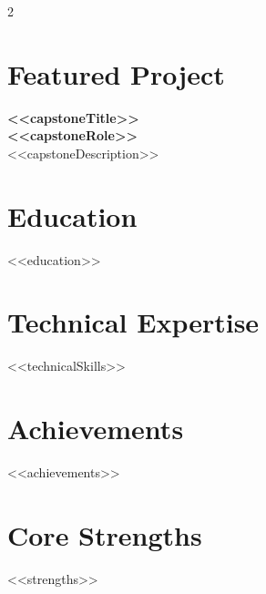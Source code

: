 \documentclass[10pt,a4paper]{article}
\begin{document}
\begin{multicols}{2}
    \columnsep=20pt
    
    \section*{Featured Project}
    {\fontsize{11pt}{13pt}\selectfont\bfseries\color{dark} <<capstoneTitle>>} \\[2pt]
    {\fontsize{8.5pt}{10pt}\selectfont\color{accent}\bfseries <<capstoneRole>>} \\[4pt]
    {\fontsize{8.5pt}{11pt}\selectfont\color{textmain} <<capstoneDescription>>}

    \section*{Education}
    {\fontsize{9pt}{11pt}\selectfont <<education>>}

    \newpage

    \section*{Technical Expertise}
    \begin{tcolorbox}[card]
        {\fontsize{8.5pt}{11pt}\selectfont <<technicalSkills>>}
    \end{tcolorbox}

    \section*{Achievements}
    \begin{itemize}[leftmargin=*, label=\textcolor{primary}{\faTrophy}, itemsep=2pt, topsep=0pt, parsep=0pt]
        {\fontsize{8.5pt}{10pt}\selectfont <<achievements>>}
    \end{itemize}

    \section*{Core Strengths}
    \begin{itemize}[leftmargin=*, label=\textcolor{accent}{\faCheckCircle}, itemsep=1pt, topsep=0pt, parsep=0pt]
        {\fontsize{8.5pt}{10pt}\selectfont <<strengths>>}
    \end{itemize}
\end{multicols}
\end{document}
